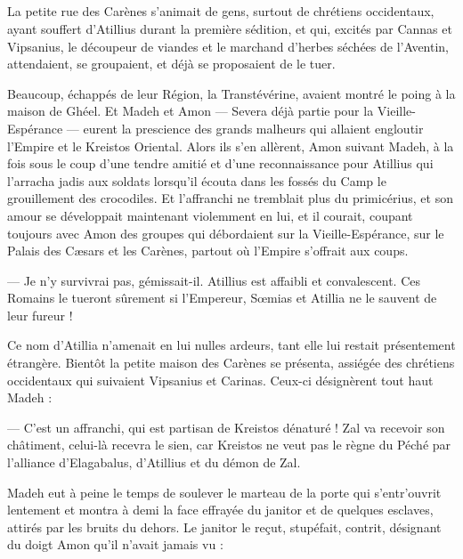 \documentclass[a4paper, 11pt, oneside, polutonikogreek, french]{article}
\begin{document}
\subsection{}
\paragraph{}
La petite rue des Carènes s'animait de gens, surtout de chrétiens occidentaux, ayant souffert d'Atillius durant la première sédition, et qui, excités par Cannas et Vipsanius, le découpeur de viandes et le marchand d'herbes séchées de l'Aventin, attendaient, se groupaient, et déjà se proposaient de le tuer.

Beaucoup, échappés de leur Région, la Transtévérine, avaient montré le poing à la maison de Ghéel. Et Madeh et Amon --- Severa déjà partie pour la Vieille-Espérance --- eurent la prescience des grands malheurs qui allaient engloutir l'Empire et le Kreistos Oriental. Alors ils s'en allèrent, Amon suivant Madeh, à la fois sous le coup d'une tendre amitié et d'une reconnaissance pour Atillius qui l'arracha jadis aux soldats lorsqu'il écouta dans les fossés du Camp le grouillement des crocodiles. Et l'affranchi ne tremblait plus du primicérius, et son amour se développait maintenant violemment en lui, et il courait, coupant toujours avec Amon des groupes qui débordaient sur la Vieille-Espérance, sur le Palais des Cæsars et les Carènes, partout où l'Empire s'offrait aux coups.

--- Je n'y survivrai pas, gémissait-il. Atillius est affaibli et convalescent. Ces Romains le tueront sûrement si l'Empereur, Sœmias et Atillia ne le sauvent de leur fureur !

Ce nom d'Atillia n'amenait en lui nulles ardeurs, tant elle lui restait présentement étrangère. Bientôt la petite maison des Carènes se présenta, assiégée des chrétiens occidentaux qui suivaient Vipsanius et Carinas. Ceux-ci désignèrent tout haut Madeh :

--- C'est un affranchi, qui est partisan de Kreistos dénaturé ! Zal va recevoir son châtiment, celui-là recevra le sien, car Kreistos ne veut pas le règne du Péché par l'alliance d'Elagabalus, d'Atillius et du démon de Zal.

Madeh eut à peine le temps de soulever le marteau de la porte qui s'entr'ouvrit lentement et montra à demi la face effrayée du janitor et de quelques esclaves, attirés par les bruits du dehors. Le janitor le reçut, stupéfait, contrit, désignant du doigt Amon qu'il n'avait jamais vu :
\end{document}
